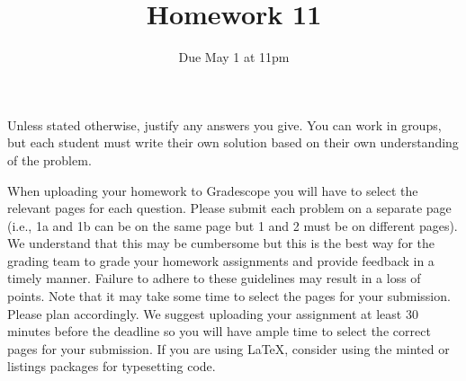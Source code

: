 \documentclass[12pt]{article}
\begin{document}
\title{\sc Homework 11}
\date{Due May 1 at 11pm} 
\author{}
\maketitle




\newtheorem*{problem}{Problem}
\newtheorem*{heuristic}{Heuristic}
\newtheorem*{conjecture}{Conjecture}
\newtheorem{theorem}{Theorem}[section]
\newtheorem{corollary}[theorem]{Corollary}
\newtheorem{prop}[theorem]{Proposition}
\newtheorem{lemma}[theorem]{Lemma}
\newtheorem{definition}[theorem]{Definition}
\theoremstyle{remark}
\newtheorem{example}[theorem]{Example}
\newtheorem{remark}[theorem]{Remark}
\newtheorem{exercise}[theorem]{Exercise}


Unless stated otherwise, justify any answers you give. You can work in groups, but each student
must write their own solution based on their own understanding of the problem.

When uploading your homework to Gradescope you will have to select the relevant pages
for each question. Please submit each problem on a separate page (i.e., 1a and 1b can be on
the same page but 1 and 2 must be on different pages). We understand that this may be
cumbersome but this is the best way for the grading team to grade your homework assignments and provide feedback in a timely manner. Failure to adhere to these guidelines may
result in a loss of points. Note that it may take some time to select the pages for your submission. Please plan accordingly. We suggest uploading your assignment at least 30 minutes
before the deadline so you will have ample time to select the correct pages for your submission. If you are using \LaTeX, consider using the minted or listings packages for typesetting code.

\medskip
\end{document}
